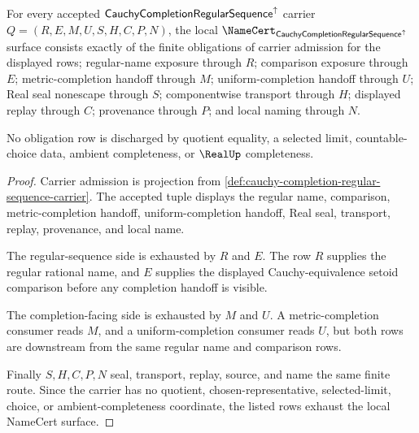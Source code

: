 \begin{theorem}
\label{thm:cauchy-completion-regular-sequence-namecert-obligations}
For every accepted $\mathsf{CauchyCompletionRegularSequence}^{\uparrow}$ carrier $Q=(R,E,M,U,S,H,C,P,N)$, the local $\NameCert_{\CauchyCompletionRegularSequenceUp}$ surface consists exactly of the finite obligations of carrier admission for the displayed rows; regular-name exposure through $R$; comparison exposure through $E$; metric-completion handoff through $M$; uniform-completion handoff through $U$; Real seal nonescape through $S$; componentwise transport through $H$; displayed replay through $C$; provenance through $P$; and local naming through $N$.

No obligation row is discharged by quotient equality, a selected limit, countable-choice data, ambient completeness, or $\RealUp$ completeness.
\end{theorem}
\begin{proof}
Carrier admission is projection from \autoref{def:cauchy-completion-regular-sequence-carrier}. The accepted tuple displays the regular name, comparison, metric-completion handoff, uniform-completion handoff, Real seal, transport, replay, provenance, and local name.

The regular-sequence side is exhausted by $R$ and $E$. The row $R$ supplies the regular rational name, and $E$ supplies the displayed Cauchy-equivalence setoid comparison before any completion handoff is visible.

The completion-facing side is exhausted by $M$ and $U$. A metric-completion consumer reads $M$, and a uniform-completion consumer reads $U$, but both rows are downstream from the same regular name and comparison rows.

Finally $S,H,C,P,N$ seal, transport, replay, source, and name the same finite route. Since the carrier has no quotient, chosen-representative, selected-limit, choice, or ambient-completeness coordinate, the listed rows exhaust the local NameCert surface.
\end{proof}

